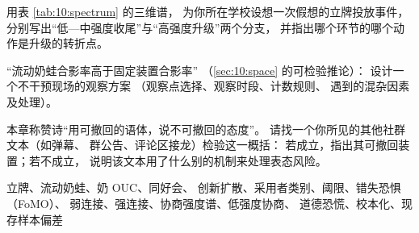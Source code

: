 \begin{nlexercises}
  \item 用表 \ref{tab:10:spectrum} 的三维谱，
        为你所在学校设想一次假想的立牌投放事件，
        分别写出“低—中强度收尾”与“高强度升级”两个分支，
        并指出哪个环节的哪个动作是升级的转折点。
  \item “流动奶蛙合影率高于固定装置合影率”
        （\ref{sec:10:space} 的可检验推论）：
        设计一个不干预现场的观察方案
        （观察点选择、观察时段、计数规则、
        遇到的混杂因素及处理）。
  \item 本章称赞诗“用可撤回的语体，说不可撤回的态度”。
        请找一个你所见的其他社群文本（如弹幕、
        群公告、评论区接龙）检验这一概括：
        若成立，指出其可撤回装置；若不成立，
        说明该文本用了什么别的机制来处理表态风险。
\end{nlexercises}

\nlkeywords 立牌、流动奶蛙、奶 OUC、同好会、
创新扩散、采用者类别、阈限、错失恐惧（FoMO）、
弱连接、强连接、协商强度谱、低强度协商、
道德恐慌、校本化、现存样本偏差
